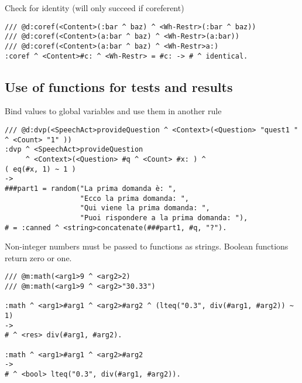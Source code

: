  Check for identity (will only succeed if coreferent)
\begin{verbatim}
/// @d:coref(<Content>(:bar ^ baz) ^ <Wh-Restr>(:bar ^ baz))
/// @d:coref(<Content>(a:bar ^ baz) ^ <Wh-Restr>(a:bar))
/// @d:coref(<Content>(a:bar ^ baz) ^ <Wh-Restr>a:)
:coref ^ <Content>#c: ^ <Wh-Restr> = #c: -> # ^ identical.
\end{verbatim}

\subsection{
 Use of functions for tests and results
}
 Bind values to global variables and use them in another rule
\begin{verbatim}
/// @d:dvp(<SpeechAct>provideQuestion ^ <Context>(<Question> "quest1 " ^ <Count> "1" ))
:dvp ^ <SpeechAct>provideQuestion
     ^ <Context>(<Question> #q ^ <Count> #x: ) ^
( eq(#x, 1) ~ 1 )
->
###part1 = random("La prima domanda è: ",
                  "Ecco la prima domanda: ",
                  "Qui viene la prima domanda: ",
                  "Puoi rispondere a la prima domanda: "),
# = :canned ^ <string>concatenate(###part1, #q, "?").
\end{verbatim}

 Non-integer numbers must be passed to functions as strings. Boolean functions
return zero or one.
\begin{verbatim}
/// @m:math(<arg1>9 ^ <arg2>2)
/// @m:math(<arg1>9 ^ <arg2>"30.33")

:math ^ <arg1>#arg1 ^ <arg2>#arg2 ^ (lteq("0.3", div(#arg1, #arg2)) ~ 1)
->
# ^ <res> div(#arg1, #arg2).

:math ^ <arg1>#arg1 ^ <arg2>#arg2
->
# ^ <bool> lteq("0.3", div(#arg1, #arg2)).
\end{verbatim}
